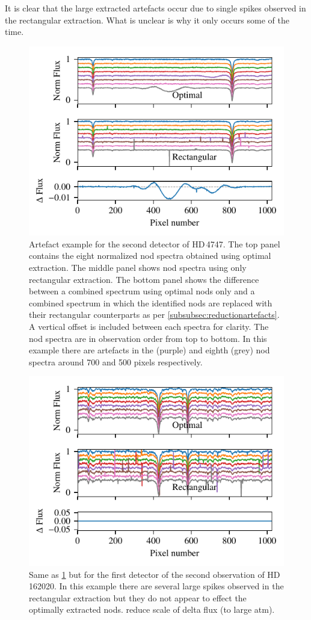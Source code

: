 It is clear that the large extracted artefacts occur due to single spikes observed in the rectangular extraction.
What is unclear is why it only occurs some of the time.




 \begin{figure}
     \centering
     \includegraphics[width=0.7\linewidth]{figures/appendix/bp_plots/extraction_comparision_HD4747-1_chip_2}
     \caption{Artefact example for the second detector of {HD\,4747}.  The top panel contains the eight normalized nod spectra obtained using optimal extraction.
The middle panel shows nod spectra using only rectangular extraction.
The bottom panel shows the difference between a combined spectrum using optimal nods only and a combined spectrum in which the identified nods are replaced with their rectangular counterparts as per \cref{subsubsec:reductionartefacts}.
A vertical offset is included between each spectra for clarity.
The nod spectra are in observation order from top to bottom.
In this example there are artefacts in the  (purple) and eighth (grey) nod spectra around 700 and 500 pixels respectively.}
     \label{fig:artefact_example1}
 \end{figure}
 \begin{figure}
     \centering
     \includegraphics[width=0.7\linewidth]{figures/appendix/bp_plots/extraction_comparision_HD162020-2_chip_1}
     \caption{Same as \cref{fig:artefact_example1} but for the first detector of the second observation of {HD\,162020}.
In this example there are several large spikes observed in the rectangular extraction but they do not appear to effect the optimally extracted nods. {\red{} reduce scale of delta flux (to large atm)}.}
     \label{fig:artefact_example2}
 \end{figure}
